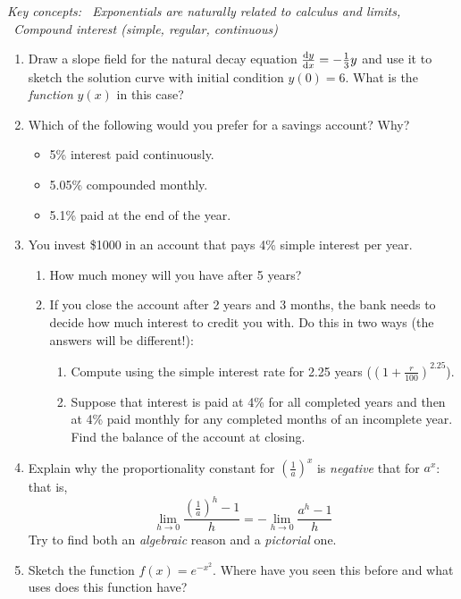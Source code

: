 \begin{exercises}{}{}
	\hangindent\leftmargini
	\emph{Key concepts: \ Exponentials are naturally related to calculus and limits, \ Compound interest (simple, regular, continuous)}
	
	\begin{enumerate}
		\item Draw a slope field for the natural decay equation $\diff[y]{x}=-\frac 13y$ and use it to sketch the solution curve with initial condition $y(0)=6$. What is the \emph{function} $y(x)$ in this case?
		
	  \item Which of the following would you prefer for a savings account? Why?
		\begin{itemize}
	  	\item 5\% interest paid continuously. %
	  	\item 5.05\% compounded monthly. %
	  	\item 5.1\% paid at the end of the year. 
		\end{itemize}
		
	   
	  \item You invest \$1000 in an account that pays 4\% simple interest per year.
	  \begin{enumerate}
	    \item How much money will you have after 5 years?
	    \item If you close the account after 2 years and 3 months, the bank needs to decide how much interest to credit you with. Do this in two ways (the answers will be different!):
	    \begin{enumerate}
	      \item Compute using the simple interest rate for 2.25 years ($(1+\frac r{100})^{2.25}$).
	      \item Suppose that interest is paid at 4\% for all completed years and then at 4\% paid monthly for any completed months of an incomplete year. Find the balance of the account at closing.
	    \end{enumerate}
		\end{enumerate}

	
	  \item Explain why the proportionality constant for $\left(\frac 1a\right)^x$ is \emph{negative} that for $a^x$: that is,
	  \[
	  	\lim_{h\to 0}\frac{(\frac 1a)^h-1}h=-\lim_{h\to 0}\frac{a^h-1}h
	  \]
	  Try to find both an \emph{algebraic} reason and a \emph{pictorial} one.
	  
	  
	  \item Sketch the function $f(x)=e^{-x^2}$. Where have you seen this before and what uses does this function have?
	\end{enumerate}

\end{exercises}


